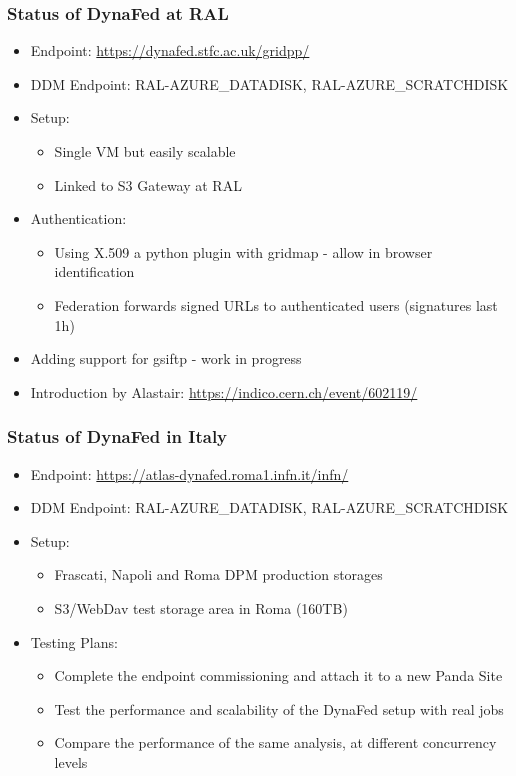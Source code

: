 \documentclass{beamer}
\begin{document}
\begin{frame}
  \frametitle{Status of DynaFed at RAL}
  \begin{itemize}
    \item Endpoint: \url{https://dynafed.stfc.ac.uk/gridpp/}
		\item DDM Endpoint: RAL-AZURE\_DATADISK, RAL-AZURE\_SCRATCHDISK
    \item Setup:
    \begin{itemize}
      \item Single VM but easily scalable
      \item Linked to S3 Gateway at RAL
    \end{itemize}
		\item Authentication:
    \begin{itemize}
      \item Using X.509 a python plugin with gridmap - allow in browser identification
      \item Federation forwards signed URLs to authenticated users (signatures last 1h)
    \end{itemize}
    \item Adding support for gsiftp - work in progress
    \item Introduction by Alastair: \url{https://indico.cern.ch/event/602119/}
  \end{itemize}
\end{frame}

\begin{frame}
  \frametitle{Status of DynaFed in Italy}
  \begin{itemize}
    \item Endpoint: \url{https://atlas-dynafed.roma1.infn.it/infn/}
		\item DDM Endpoint: RAL-AZURE\_DATADISK, RAL-AZURE\_SCRATCHDISK
    \item Setup:
    \begin{itemize}
      \item Frascati, Napoli and Roma DPM  production storages
      \item S3/WebDav test storage area in Roma (160TB)
    \end{itemize}
		\item Testing Plans:
    \begin{itemize}
      \item Complete the endpoint commissioning and attach it to a new Panda Site
      \item Test the performance and scalability of the DynaFed setup with real jobs
      \item Compare the performance of the same analysis, at different concurrency levels
    \end{itemize}
  \end{itemize}
\end{frame}
\end{document}
